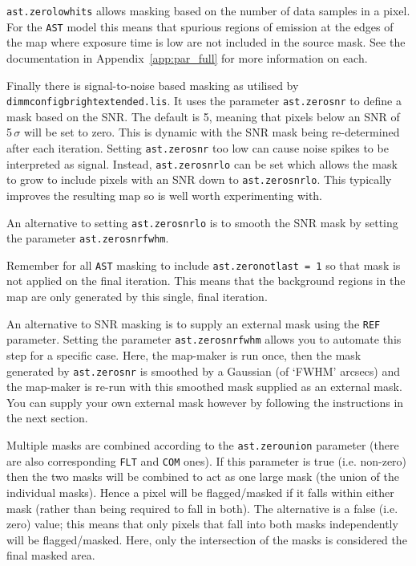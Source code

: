 \documentclass[twoside,11pt]{article}
\newcommand{\htmlref}[2]{#1}
\newcommand{\latexhtml}[2]{#1}
\renewcommand{\_}{\texttt{\symbol{95}}}
\newcommand{\cref}[3]{\latexhtml{#1~\ref{#2}}{\htmlref{#3}{#2}}}
\begin{document}
\texttt{ast.zero\_lowhits} allows masking based on the number of data
samples in a pixel. For the \texttt{AST} model this means that
spurious regions of emission at the edges of the map where exposure
time is low are not included in the source mask. See the documentation
in \cref{Appendix}{app:par_full}{Configuration Parameters:
dimmconfig.lis} for more information on each.

Finally there is signal-to-noise based masking as utilised by
\texttt{dimmconfig\_bright\_extended.lis}. It uses the parameter
\texttt{ast.zero\_snr} to define a mask based on the SNR. The default
is 5, meaning that pixels below an SNR of 5\,$\sigma$ will be set to
zero. This is dynamic with the SNR mask being re-determined after each
iteration. Setting \texttt{ast.zero\_snr} too low can cause noise
spikes to be interpreted as signal. Instead, \texttt{ast.zero\_snrlo}
can be set which allows the mask to grow to include pixels with an SNR
down to \texttt{ast.zero\_snrlo}. This typically improves the
resulting map so is well worth experimenting with.

An alternative to setting \texttt{ast.zero\_snrlo} is to smooth the
SNR mask by setting the parameter \texttt{ast.zero\_snr\_fwhm}.

Remember for all \texttt{AST} masking to include
\texttt{ast.zero\_notlast = 1} so that mask is not applied on the
final iteration. This means that the background regions in the map are
only generated by this single, final iteration.

An alternative to SNR masking is to supply an external mask using the
\texttt{REF} parameter.  Setting the parameter
\texttt{ast.zero\_snr\_fwhm} allows you to automate this step for a
specific case. Here, the map-maker is run once, then the mask
generated by \texttt{ast.zero\_snr} is smoothed by a Gaussian (of
`FWHM' arcsecs) and the map-maker is re-run with this smoothed mask
supplied as an external mask. You can supply your own external mask
however by following the instructions in the next section.

Multiple masks are combined according to the \texttt{ast.zero\_union}
parameter (there are also corresponding \texttt{FLT} and \texttt{COM}
ones). If this parameter is true (i.e. non-zero) then the two masks
will be combined to act as one large mask (the union of the individual
masks). Hence a pixel will be flagged/masked if it falls within either
mask (rather than being required to fall in both). The alternative is
a false (i.e. zero) value; this means that only pixels that fall into
both masks independently will be flagged/masked. Here, only the
intersection of the masks is considered the final masked area.
\end{document}
